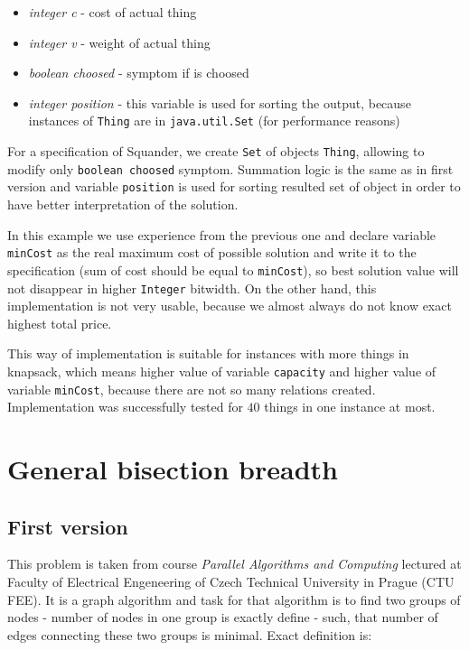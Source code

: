 \documentclass[11pt,twoside,a4paper]{book}
\begin{document}
\begin{itemize}
  \item \textit{integer c} - cost of actual thing
  \item \textit{integer v} - weight of actual thing
  \item \textit{boolean choosed} - symptom if is choosed
  \item \textit{integer position} - this variable is used for sorting the
  output, because instances of \verb|Thing| are in \verb|java.util.Set|
  (for performance reasons)
\end{itemize}

For a specification of Squander, we create \verb|Set| of objects \verb|Thing|,
allowing to modify only \verb|boolean choosed| symptom. Summation logic is the
same as in first version and variable \verb|position| is used for sorting
resulted set of object in order to have better interpretation of the solution.

In this example we use experience from the previous one and declare variable
\verb|minCost| as the real maximum cost of possible solution and write it to the
specification (sum of cost should be equal to \verb|minCost|), so best
solution value will not disappear in higher \verb|Integer| bitwidth. On the
other hand, this implementation is not very usable, because we almost always do
not know exact highest total price.



This way of implementation is suitable for instances with more things in
knapsack, which means higher value of variable \verb|capacity| and higher value
of variable \verb|minCost|, because there are not so many relations created.
Implementation was successfully tested for $40$ things in one instance at most.

\section{General bisection breadth}

\subsection{First version}

\label{sec:gbb}
This problem is taken from course \textit{Parallel Algorithms and Computing}
\cite{tvrdik:par} lectured at Faculty of Electrical Engeneering of Czech Technical University in
Prague (CTU FEE). It is a graph algorithm and task for that algorithm is to find
two groups of nodes - number of nodes in one group is exactly define - such, that
number of edges connecting these two groups is minimal. Exact definition is:
\end{document}
